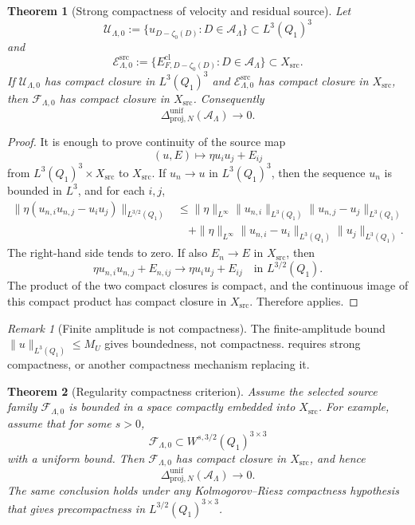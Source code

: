 \documentclass[11pt]{article}
\numberwithin{equation}{section}
\newtheorem{theorem}{Theorem}[section]
\theoremstyle{definition}
\theoremstyle{remark}
\newtheorem{remark}[remark]{Remark}
\newcommand{\proj}{\mathrm{proj}}
\newcommand{\src}{\mathrm{src}}
\newcommand{\cl}{\mathrm{cl}}
\begin{document}
\begin{theorem}[Strong compactness of velocity and residual source]
\label{thm:strong-compactness-velocity-residual}
Let
\[
    \mathcal U_{\Lambda,0}
    :=
    \{u_{D-\zeta_0(D)}:D\in\mathcal A_\Lambda\}
    \subset L^3(Q_1)^3
\]
and
\[
    \mathcal E^{\src}_{\Lambda,0}
    :=
    \{E^{\cl}_{F,D-\zeta_0(D)}:D\in\mathcal A_\Lambda\}
    \subset X_{\src} .
\]
If \(\mathcal U_{\Lambda,0}\) has compact closure in \(L^3(Q_1)^3\) and
\(\mathcal E^{\src}_{\Lambda,0}\) has compact closure in \(X_{\src}\), then
\(\mathcal F_{\Lambda,0}\) has compact closure in \(X_{\src}\).  Consequently
\[
    \Delta^{\mathrm{unif}}_{\proj,N}(\mathcal A_\Lambda)\to0.
\]
\end{theorem}

\begin{proof}
It is enough to prove continuity of the source map
\[
    (u,E)\mapsto \eta u_i u_j+E_{ij}
\]
from \(L^3(Q_1)^3\times X_{\src}\) to \(X_{\src}\).  If \(u_n\to u\) in
\(L^3(Q_1)^3\), then the sequence \(u_n\) is bounded in \(L^3\), and for
each \(i,j\),
\[
\begin{aligned}
    \|\eta(u_{n,i}u_{n,j}-u_i u_j)\|_{L^{3/2}(Q_1)}
    &\le
    \|\eta\|_{L^\infty}
    \|u_{n,i}\|_{L^3(Q_1)}
    \|u_{n,j}-u_j\|_{L^3(Q_1)}
\\
    &\quad+
    \|\eta\|_{L^\infty}
    \|u_{n,i}-u_i\|_{L^3(Q_1)}
    \|u_j\|_{L^3(Q_1)}.
\end{aligned}
\]
The right-hand side tends to zero.  If also \(E_n\to E\) in \(X_{\src}\), then
\[
    \eta u_{n,i}u_{n,j}+E_{n,ij}
    \to
    \eta u_i u_j+E_{ij}
    \quad\text{in }L^{3/2}(Q_1).
\]
The product of the two compact closures is compact, and the continuous image
of this compact product has compact closure in \(X_{\src}\).  Therefore
 applies.
\end{proof}

\begin{remark}[Finite amplitude is not compactness]
The finite-amplitude bound \(\|u\|_{L^3(Q_1)}\le M_U\) gives boundedness,
not compactness.   requires
strong compactness, or another compactness mechanism replacing it.
\end{remark}

\begin{theorem}[Regularity compactness criterion]
\label{thm:regularity-translation-compactness}
Assume the selected source family \(\mathcal F_{\Lambda,0}\) is bounded in a
space compactly embedded into \(X_{\src}\).  For example, assume that for some
\(s>0\),
\[
    \mathcal F_{\Lambda,0}
    \subset W^{s,3/2}(Q_1)^{3\times 3}
\]
with a uniform bound.  Then \(\mathcal F_{\Lambda,0}\) has compact closure in
\(X_{\src}\), and hence
\[
    \Delta^{\mathrm{unif}}_{\proj,N}(\mathcal A_\Lambda)\to0.
\]
The same conclusion holds under any Kolmogorov--Riesz compactness hypothesis
that gives precompactness in \(L^{3/2}(Q_1)^{3\times3}\).
\end{theorem}
\end{document}
